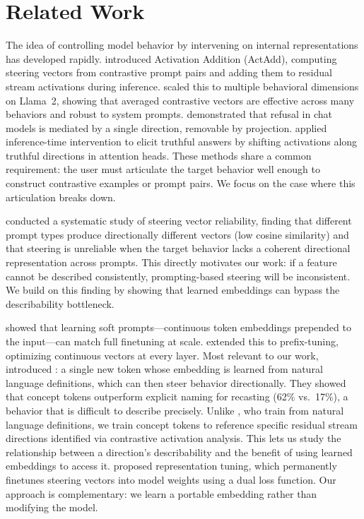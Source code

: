 \section{Related Work}
\label{sec:related}

The idea of controlling model behavior by intervening on internal representations has developed rapidly. \citet{turner2023steering} introduced Activation Addition (ActAdd), computing steering vectors from contrastive prompt pairs and adding them to residual stream activations during inference. \citet{rimsky2023steering} scaled this to multiple behavioral dimensions on Llama~2, showing that averaged contrastive vectors are effective across many behaviors and robust to system prompts. \citet{arditi2024refusal} demonstrated that refusal in chat models is mediated by a single direction, removable by projection. \citet{li2023inference} applied inference-time intervention to elicit truthful answers by shifting activations along truthful directions in attention heads. These methods share a common requirement: the user must articulate the target behavior well enough to construct contrastive examples or prompt pairs. We focus on the case where this articulation breaks down.

\citet{braun2025unreliability} conducted a systematic study of steering vector reliability, finding that different prompt types produce directionally different vectors (low cosine similarity) and that steering is unreliable when the target behavior lacks a coherent directional representation across prompts. This directly motivates our work: if a feature cannot be described consistently, prompting-based steering will be inconsistent. We build on this finding by showing that learned embeddings can bypass the describability bottleneck.

\citet{lester2021power} showed that learning soft prompts---continuous token embeddings prepended to the input---can match full finetuning at scale. \citet{li2021prefix} extended this to prefix-tuning, optimizing continuous vectors at every layer. Most relevant to our work, \citet{sastre2026concept} introduced \concepttokens: a single new token whose embedding is learned from natural language definitions, which can then steer behavior directionally. They showed that concept tokens outperform explicit naming for recasting (62\% vs.\ 17\%), a behavior that is difficult to describe precisely. Unlike \citet{sastre2026concept}, who train from natural language definitions, we train concept tokens to reference specific residual stream directions identified via contrastive activation analysis. This lets us study the relationship between a direction's describability and the benefit of using learned embeddings to access it. \citet{ackerman2024representation} proposed representation tuning, which permanently finetunes steering vectors into model weights using a dual loss function. Our approach is complementary: we learn a portable embedding rather than modifying the model.

